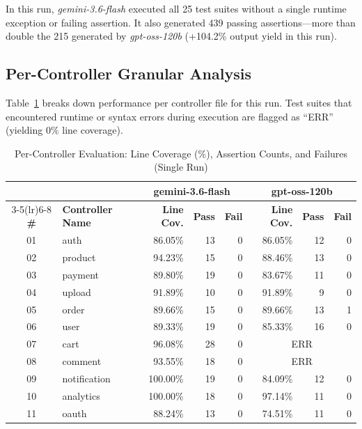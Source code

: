 \documentclass[conference]{IEEEtran}
\begin{document}
In this run, \textit{gemini-3.6-flash} executed all 25 test suites without a single runtime exception or failing assertion. It also generated 439 passing assertions---more than double the 215 generated by \textit{gpt-oss-120b} (+104.2\% output yield in this run).

\subsection{Per-Controller Granular Analysis}

Table~\ref{tab:percontroller} breaks down performance per controller file for this run. Test suites that encountered runtime or syntax errors during execution are flagged as ``ERR'' (yielding 0\% line coverage).

\begin{table}[ht]
\centering
\caption{Per-Controller Evaluation: Line Coverage (\%), Assertion Counts, and Failures (Single Run)}
\label{tab:percontroller}
\setlength{\tabcolsep}{5pt}
\begin{tabular}{@{}clrrrrrr@{}}
\toprule
& & \multicolumn{3}{c}{\textbf{gemini-3.6-flash}} & \multicolumn{3}{c}{\textbf{gpt-oss-120b}} \\
\cmidrule(lr){3-5}\cmidrule(lr){6-8}
\textbf{\#} & \textbf{Controller Name} & \textbf{Line Cov.} & \textbf{Pass} & \textbf{Fail} & \textbf{Line Cov.} & \textbf{Pass} & \textbf{Fail} \\
\midrule
01 & auth           & 86.05\%  & 13 & 0 & 86.05\%  & 12 &  0 \\
02 & product        & 94.23\%  & 15 & 0 & 88.46\%  & 13 &  0 \\
03 & payment        & 89.80\%  & 19 & 0 & 83.67\%  & 11 &  0 \\
04 & upload         & 91.89\%  & 10 & 0 & 91.89\%  &  9 &  0 \\
05 & order          & 89.66\%  & 15 & 0 & 89.66\%  & 13 &  1 \\
06 & user           & 89.33\%  & 19 & 0 & 85.33\%  & 16 &  0 \\
07 & cart           & 96.08\%  & 28 & 0 & \multicolumn{3}{c}{ERR} \\
08 & comment        & 93.55\%  & 18 & 0 & \multicolumn{3}{c}{ERR} \\
09 & notification   & 100.00\% & 19 & 0 & 84.09\%  & 12 &  0 \\
10 & analytics      & 100.00\% & 18 & 0 & 97.14\%  & 11 &  0 \\
11 & oauth          & 88.24\%  & 13 & 0 & 74.51\%  & 11 &  0 \\

\end{tabular}
\end{table}
\end{document}
